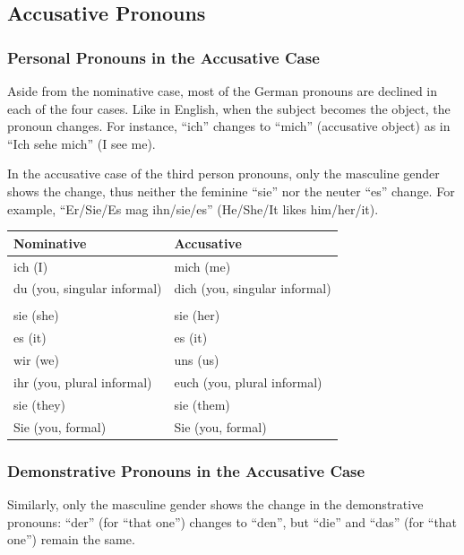 \pagebreak
\subsection{Accusative Pronouns}

\subsubsection{Personal Pronouns in the Accusative Case}

Aside from the nominative case, most of the German pronouns are declined in each of the four cases. Like in English, when the subject becomes the object, the pronoun changes. For instance, ``ich'' changes to ``mich'' (accusative object) as in ``Ich sehe mich'' (I see me).

In the accusative case of the third person pronouns, only the masculine gender shows the change, thus neither the feminine ``sie'' nor the neuter ``es'' change. For example, ``Er/Sie/Es mag ihn/sie/es'' (He/She/It likes him/her/it).

\begin{center}\begin{tabular}{l|l}
  \textbf{Nominative} & \textbf{Accusative} \\
	\hline
	ich (I) & mich (me) \\
	du (you, singular informal) & dich (you, singular informal) \\
	\Blue{er (he)} & \Blue{ihn (him)} \\
	sie (she) & sie (her) \\
	es (it) & es (it) \\
	wir (we) & uns (us) \\
	ihr (you, plural informal) & euch (you, plural informal) \\
	sie (they) & sie (them) \\
	Sie (you, formal) & Sie (you, formal) \\
\end{tabular}\end{center}

\subsubsection{Demonstrative Pronouns in the Accusative Case}

Similarly, only the masculine gender shows the change in the demonstrative pronouns: ``der'' (for ``that one'') changes to ``den'', but ``die'' and ``das'' (for ``that one'') remain the same.

